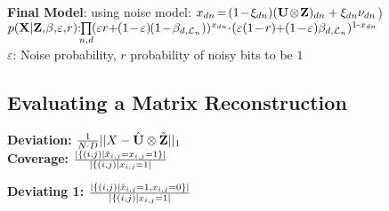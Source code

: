 \documentclass[a4paper,11pt]{article}
\renewcommand{\epsilon}{\varepsilon}
\begin{document}
\begin{multicols}{2}
\textbf{Final Model}: using noise model: $x_{dn} \hspace{-0.05cm} = \hspace{-0.05cm} (1 \hspace{-0.05cm}  - \hspace{-0.05cm} \xi_{dn})(\mathbf U \hspace{-0.05cm} \otimes \hspace{-0.05cm}  \mathbf Z)_{dn}+\xi_{dn}\nu_{dn}$)\\
${p(\mathbf X| \mathbf Z,\hspace{-0.05cm}  \mathbf \beta,\hspace{-0.05cm}  \epsilon, \hspace{-0.05cm}  r) \hspace{-0.1cm}:
   \hspace{-0.15cm}\prod\limits_{n,d}\hspace{-0.05cm} (\epsilon r \hspace{-0.08cm} + \hspace{-0.09cm}(1 \hspace{-0.05cm} - \hspace{-0.05cm}\epsilon) \hspace{-0.03cm} (1 \hspace{-0.05cm}  - \hspace{-0.05cm} \beta_{d, \mathcal L_n}))^{x_{dn}}
   \hspace{-0.09cm}\cdot \hspace{-0.06cm}( \epsilon(1 \hspace{-0.05cm} - \hspace{-0.05cm} r) \hspace{-0.09cm} + \hspace{-0.09cm} (1 \hspace{-0.05cm} - \hspace{-0.05cm} \epsilon)\beta_{d,\mathcal L_n})^{1\text{-}x_{dn}}}$\\
$\epsilon$: Noise probability, $r$ probability of noisy bits to be $1$

\subsection{Evaluating a Matrix Reconstruction}
\begin{minipage}{0.46\columnwidth}
  \textbf{Deviation:} ${1\over N\cdot D} ||X-\hat{ \mathbf{U}} \otimes \hat{\mathbf Z} ||_1$\\
  \textbf{Coverage:} ${|\{(i,j)|\hat x_{i,j} = x_{i,j} = 1\}| \over |\{(i,j)|x_{i,j}=1|}$\\
\end{minipage}
\begin{minipage}{0.5\columnwidth}
  \textbf{Deviating 1:} ${|\{(i,j)|\hat x_{i,j} = 1, x_{i,j} = 0\}| \over |\{(i,j)|x_{i,j}=1|}$\\


\end{minipage}
\end{multicols}
\end{document}
